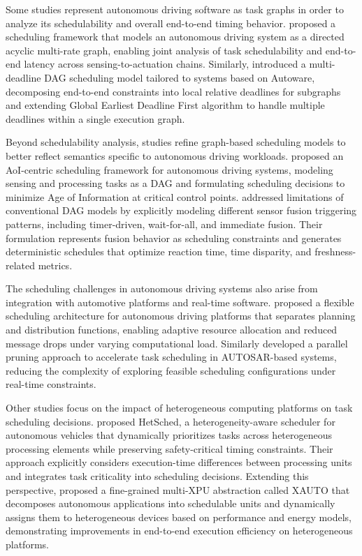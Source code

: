 Some studies represent autonomous driving software as task graphs in order to analyze its schedulability and overall end-to-end timing behavior.  proposed a scheduling framework that models an autonomous driving system as a directed acyclic multi-rate graph, enabling joint analysis of task schedulability and end-to-end latency across sensing-to-actuation chains. Similarly,  introduced a multi-deadline DAG scheduling model tailored to systems based on Autoware, decomposing end-to-end constraints into local relative deadlines for subgraphs and extending Global Earliest Deadline First algorithm to handle multiple deadlines within a single execution graph.

Beyond schedulability analysis, studies refine graph-based scheduling models to better reflect semantics specific to autonomous driving workloads.  proposed an AoI-centric scheduling framework for autonomous driving systems, modeling sensing and processing tasks as a DAG and formulating scheduling decisions to minimize Age of Information at critical control points.  addressed limitations of conventional DAG models by explicitly modeling different sensor fusion triggering patterns, including timer-driven, wait-for-all, and immediate fusion. Their formulation represents fusion behavior as scheduling constraints and generates deterministic schedules that optimize reaction time, time disparity, and freshness-related metrics.

The scheduling challenges in autonomous driving systems also arise from integration with automotive platforms and real-time software.  proposed a flexible scheduling architecture for autonomous driving platforms that separates planning and distribution functions, enabling adaptive resource allocation and reduced message drops under varying computational load. Similarly  developed a parallel pruning approach to accelerate task scheduling in AUTOSAR-based systems, reducing the complexity of exploring feasible scheduling configurations under real-time constraints.

Other studies focus on the impact of heterogeneous computing platforms on task scheduling decisions.  proposed HetSched, a heterogeneity-aware scheduler for autonomous vehicles that dynamically prioritizes tasks across heterogeneous processing elements while preserving safety-critical timing constraints. Their approach explicitly considers execution-time differences between processing units and integrates task criticality into scheduling decisions. Extending this perspective,  proposed a fine-grained multi-XPU abstraction called XAUTO that decomposes autonomous applications into schedulable units and dynamically assigns them to heterogeneous devices based on performance and energy models, demonstrating improvements in end-to-end execution efficiency on heterogeneous platforms.

